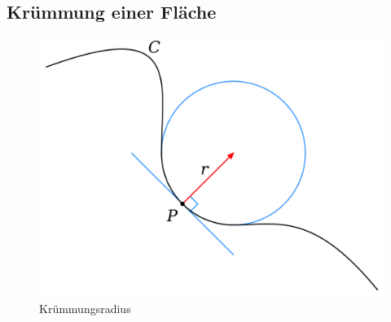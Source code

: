 \begin{refsection}
\subsection{Krümmung einer Fläche}
\label{KruemmungEinerFlaeche}





\begin{figure} 
  \centering
  \includegraphics[scale=0.1]{minimal/Kruemmungsradius.png}
  \caption{Krümmungsradius} 
  \label{Kruemmungsradius}
\end{figure}


\end{refsection}

